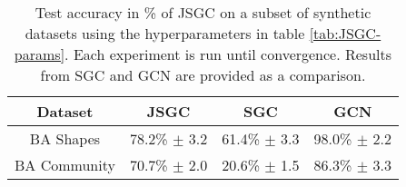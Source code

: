 \begin{table}
    \centering
    \begin{tabular}{c|c|cc}
        \textbf{Dataset} & \textbf{JSGC} & \textbf{SGC} & \textbf{GCN} \\
        \midrule
        BA Shapes       & 78.2\% $\pm$ 3.2 & 61.4\% $\pm$ 3.3 & 98.0\% $\pm$ 2.2 \\
        BA Community    & 70.7\% $\pm$ 2.0 & 20.6\% $\pm$ 1.5 & 86.3\% $\pm$ 3.3 \\
    \end{tabular}
    \caption{Test accuracy in \% of JSGC on a subset of synthetic datasets using the hyperparameters in table \ref{tab:JSGC-params}. Each experiment is run until convergence. Results from SGC and GCN are provided as a comparison.}
    \label{tab:JSGC-acc}
\end{table}

